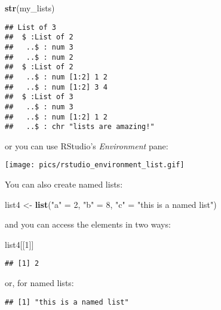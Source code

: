 \documentclass[
]{article}
\newenvironment{Shaded}{\begin{snugshade}}{\end{snugshade}}
\newcommand{\DecValTok}[1]{\textcolor[rgb]{0.00,0.00,0.81}{#1}}
\newcommand{\KeywordTok}[1]{\textcolor[rgb]{0.13,0.29,0.53}{\textbf{#1}}}
\newcommand{\NormalTok}[1]{#1}
\newcommand{\OperatorTok}[1]{\textcolor[rgb]{0.81,0.36,0.00}{\textbf{#1}}}
\newcommand{\StringTok}[1]{\textcolor[rgb]{0.31,0.60,0.02}{#1}}
\begin{document}
\begin{Shaded}
\begin{Highlighting}[]
\KeywordTok{str}\NormalTok{(my\_lists)}
\end{Highlighting}
\end{Shaded}

\begin{verbatim}
## List of 3
##  $ :List of 2
##   ..$ : num 3
##   ..$ : num 2
##  $ :List of 2
##   ..$ : num [1:2] 1 2
##   ..$ : num [1:2] 3 4
##  $ :List of 3
##   ..$ : num 3
##   ..$ : num [1:2] 1 2
##   ..$ : chr "lists are amazing!"
\end{verbatim}

or you can use RStudio's \emph{Environment} pane:

\texttt{[image: pics/rstudio\_environment\_list.gif]}

You can also create named lists:

\begin{Shaded}
\begin{Highlighting}[]
\NormalTok{list4 \textless{}{-}}\StringTok{ }\KeywordTok{list}\NormalTok{(}\StringTok{"a"}\NormalTok{ =}\StringTok{ }\DecValTok{2}\NormalTok{, }\StringTok{"b"}\NormalTok{ =}\StringTok{ }\DecValTok{8}\NormalTok{, }\StringTok{"c"}\NormalTok{ =}\StringTok{ "this is a named list"}\NormalTok{)}
\end{Highlighting}
\end{Shaded}

and you can access the elements in two ways:

\begin{Shaded}
\begin{Highlighting}[]
\NormalTok{list4[[}\DecValTok{1}\NormalTok{]]}
\end{Highlighting}
\end{Shaded}

\begin{verbatim}
## [1] 2
\end{verbatim}

or, for named lists:

\begin{Shaded}
\end{Shaded}

\begin{verbatim}
## [1] "this is a named list"
\end{verbatim}
\end{document}
